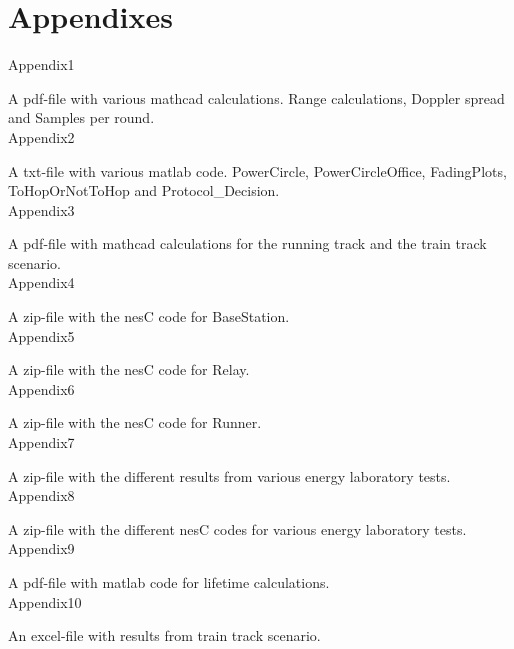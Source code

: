 
 \label{sc:bibliography}

\section*{Appendixes}
\noindent Appendix1

\noindent A pdf-file with various mathcad calculations. Range calculations, Doppler spread and Samples per round.\\

\noindent Appendix2

\noindent A txt-file with various matlab code. PowerCircle, PowerCircleOffice, FadingPlots, ToHopOrNotToHop and Protocol\_Decision.\\

\noindent Appendix3

\noindent A pdf-file with mathcad calculations for the running track and the train track scenario.\\

\noindent Appendix4

\noindent A zip-file with the nesC code for BaseStation.\\

\noindent Appendix5

\noindent A zip-file with the nesC code for Relay.\\

\noindent Appendix6

\noindent A zip-file with the nesC code for Runner.\\

\noindent Appendix7

\noindent A zip-file with the different results from various energy laboratory tests.\\

\noindent Appendix8

\noindent A zip-file with the different nesC codes for various energy laboratory tests.\\

\noindent Appendix9

\noindent A pdf-file with matlab code for lifetime calculations.\\

\noindent Appendix10

\noindent An excel-file with results from train track scenario.\\